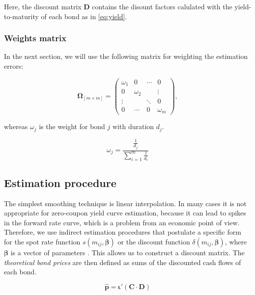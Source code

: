 Here, the discount matrix $\bm{D}$ contains the disount factors calulated with the yield-to-maturity of each bond as in \eqref{eq:yield}.

\subsubsection*{Weights matrix}

In the next section, we will use the following matrix for weighting the estimation errors:


\begin{equation*}\label{weights}
    \bm{\Omega}_{\left[m\times m\right]}= \begin{pmatrix}
 \omega_1 & 0 &\cdots  &0  \\
 0 & \omega_2 &  & \vdots \\
 \vdots &  & \ddots & 0 \\
 0 &\cdots  &0  & \omega_m
\end{pmatrix},
\end{equation*}


whereas $\omega_j$ is the weight for bond $j$ with duration $d_j$.

\begin{equation}
\label{eq:durationweight}
    \omega_j=\frac{\frac{1}{d_j}}{\sum_{i=1}^m\frac{1}{d_i}}
\end{equation}



\subsection{Estimation procedure}
\label{sec:estimation}

The simplest smoothing technique is linear interpolation. In many cases it is not appropriate for zero-coupon yield curve estimation, because it can lead to spikes in the forward rate curve, which is a problem from an economic point of view. Therefore, we use indirect estimation procedures that postulate a specific form for the spot rate function $s(m_{ij}, \bm{\beta})$ or the discount function $\delta(m_{ij}, \bm{\beta})$, where $\bm{\beta}$ is a vector of parameters \citep[see, e.g.][]{Martellini2003}. This allows us to construct a discount matrix. The \emph{theoretical bond prices} are then defined as sums of the discounted cash flows of each bond.

\begin{equation}
  \label{eq:theorprices}
  \bm{\hat{p}} = \bm{\iota}'(\bm{C}\cdot\bm{D})
\end{equation}



